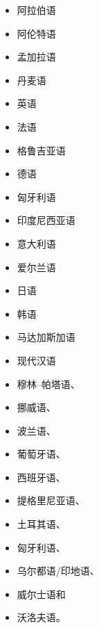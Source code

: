 \begin{itemize}
\item 阿拉伯语\citep{Attia2008a-u}
\item 阿伦特语\citep*{Dras2012a-u}
\item 孟加拉语\citep{SC97a-u}
\item 丹麦语\citep{Oersnes2002b-u,OW2003a-u,OW2004a-u}
\item 英语\citep*{HHP91a-u,BDFK99a-u,RKKCMJ2002a-u,KM2007a-u}
\item 法语\citep*{Zweigenbaum91a-u,Frank96b-u,FZ2002a-u,BDFK99a-u,CK2001a-u,BSL2005a-u,SdA2016a-u,Alencar2017a-u}
%
%
\item 格鲁吉亚语\citep{Meurer2009a-u}
\item 德语\citep{Rohrer96a,Berman96a-u,KR97a-u,BDFK99a-u,Dipper2003a-u,RF2006a,Forst2006a-u,Frank2006a-u,FR2009a-u}
\item 匈牙利语\citep{LRT2010a-u}
\item 印度尼西亚语\citep*{AADMS2009a-u}
\item 意大利语\citep*{Delmonte90a-u,Mayo99a-u,Quaglia2012a-u}
\item 爱尔兰语\citep{Sulger2009a-u,Sulger2010a-u}
\item 日语\citep*{HHP91a-u,MO2003a-u,Umemoto2006a-u}
\item 韩语\citep*{HHP91a-u}
\item 马达加斯加语\citep*{Randriamasimanana2006a-u,DLM2006a-u}
\item 现代汉语\citep*{HHP91a-u,FK2007a-u}
\item 穆林--帕塔语\citep{SN2012a-u}、
\item 挪威语\citep*{DMR2005a}、
\item 波兰语\citep*{PP2012a-u}、
\item 葡萄牙语\citep{Alencar2004a-u,Alencar2013a-u,Alencar2015a-u}、
\item 西班牙语\citep{Mayo99a-u}、
\item 提格里尼亚语\citep{Kifle2012a-u}、
\item 土耳其语\citep{CO2006a-u}、
\item 匈牙利语\citep*{LRT2010a-u,RLC2011a-u}、
\item 乌尔都语/印地语\citep*{BHKR2007a-u,BBS2008a-u}、
\item 威尔士语\citep{MS2005a-u}和
\item 沃洛夫语\citep{Dione2012b-u,Dione2013a-u}。
\end{itemize}
